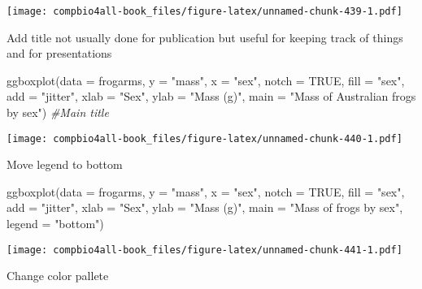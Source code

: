 \documentclass[
]{book}
\newenvironment{Shaded}{\begin{snugshade}}{\end{snugshade}}
\newcommand{\AttributeTok}[1]{\textcolor[rgb]{0.77,0.63,0.00}{#1}}
\newcommand{\CommentTok}[1]{\textcolor[rgb]{0.56,0.35,0.01}{\textit{#1}}}
\newcommand{\ConstantTok}[1]{\textcolor[rgb]{0.00,0.00,0.00}{#1}}
\newcommand{\FunctionTok}[1]{\textcolor[rgb]{0.00,0.00,0.00}{#1}}
\newcommand{\NormalTok}[1]{#1}
\newcommand{\StringTok}[1]{\textcolor[rgb]{0.31,0.60,0.02}{#1}}
\begin{document}
\texttt{[image: compbio4all-book\_files/figure-latex/unnamed-chunk-439-1.pdf]}

Add title
not usually done for publication but useful for keeping track of things and for presentations

\begin{Shaded}
\begin{Highlighting}[]
\FunctionTok{ggboxplot}\NormalTok{(}\AttributeTok{data =}\NormalTok{ frogarms,}
          \AttributeTok{y =} \StringTok{"mass"}\NormalTok{,}
          \AttributeTok{x =} \StringTok{"sex"}\NormalTok{,}
          \AttributeTok{notch  =} \ConstantTok{TRUE}\NormalTok{,}
          \AttributeTok{fill =} \StringTok{"sex"}\NormalTok{,}
          \AttributeTok{add =} \StringTok{"jitter"}\NormalTok{,}
          \AttributeTok{xlab =} \StringTok{"Sex"}\NormalTok{,}
          \AttributeTok{ylab =} \StringTok{"Mass (g)"}\NormalTok{,}
          \AttributeTok{main =} \StringTok{"Mass of Australian frogs by sex"}\NormalTok{) }\CommentTok{\#Main title}
\end{Highlighting}
\end{Shaded}

\texttt{[image: compbio4all-book\_files/figure-latex/unnamed-chunk-440-1.pdf]}

Move legend to bottom

\begin{Shaded}
\begin{Highlighting}[]
\FunctionTok{ggboxplot}\NormalTok{(}\AttributeTok{data =}\NormalTok{ frogarms,}
          \AttributeTok{y =} \StringTok{"mass"}\NormalTok{,}
          \AttributeTok{x =} \StringTok{"sex"}\NormalTok{,}
          \AttributeTok{notch  =} \ConstantTok{TRUE}\NormalTok{,}
          \AttributeTok{fill =} \StringTok{"sex"}\NormalTok{,}
          \AttributeTok{add =} \StringTok{"jitter"}\NormalTok{,}
          \AttributeTok{xlab =} \StringTok{"Sex"}\NormalTok{,}
          \AttributeTok{ylab =} \StringTok{"Mass (g)"}\NormalTok{,}
          \AttributeTok{main =} \StringTok{"Mass of frogs by sex"}\NormalTok{,}
          \AttributeTok{legend =} \StringTok{"bottom"}\NormalTok{)}
\end{Highlighting}
\end{Shaded}

\texttt{[image: compbio4all-book\_files/figure-latex/unnamed-chunk-441-1.pdf]}

Change color pallete
\end{document}
